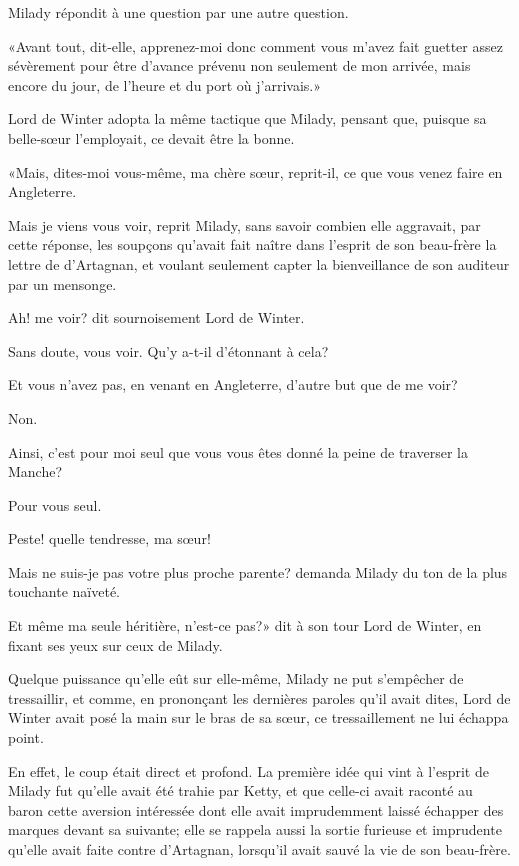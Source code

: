 Milady répondit à une question par une autre question. 

«Avant tout, dit-elle, apprenez-moi donc comment vous m'avez fait guetter assez sévèrement pour être d'avance prévenu non seulement de mon arrivée, mais encore du jour, de l'heure et du port où j'arrivais.» 

Lord de Winter adopta la même tactique que Milady, pensant que, puisque sa belle-sœur l'employait, ce devait être la bonne. 

«Mais, dites-moi vous-même, ma chère sœur, reprit-il, ce que vous venez faire en Angleterre. 

\speak  Mais je viens vous voir, reprit Milady, sans savoir combien elle aggravait, par cette réponse, les soupçons qu'avait fait naître dans l'esprit de son beau-frère la lettre de d'Artagnan, et voulant seulement capter la bienveillance de son auditeur par un mensonge. 

\speak  Ah! me voir? dit sournoisement Lord de Winter. 

\speak  Sans doute, vous voir. Qu'y a-t-il d'étonnant à cela? 

\speak  Et vous n'avez pas, en venant en Angleterre, d'autre but que de me voir? 

\speak  Non. 

\speak  Ainsi, c'est pour moi seul que vous vous êtes donné la peine de traverser la Manche? 

\speak  Pour vous seul. 

\speak  Peste! quelle tendresse, ma sœur! 

\speak  Mais ne suis-je pas votre plus proche parente? demanda Milady du ton de la plus touchante naïveté. 

\speak  Et même ma seule héritière, n'est-ce pas?» dit à son tour Lord de Winter, en fixant ses yeux sur ceux de Milady. 

Quelque puissance qu'elle eût sur elle-même, Milady ne put s'empêcher de tressaillir, et comme, en prononçant les dernières paroles qu'il avait dites, Lord de Winter avait posé la main sur le bras de sa sœur, ce tressaillement ne lui échappa point. 

En effet, le coup était direct et profond. La première idée qui vint à l'esprit de Milady fut qu'elle avait été trahie par Ketty, et que celle-ci avait raconté au baron cette aversion intéressée dont elle avait imprudemment laissé échapper des marques devant sa suivante; elle se rappela aussi la sortie furieuse et imprudente qu'elle avait faite contre d'Artagnan, lorsqu'il avait sauvé la vie de son beau-frère. 

